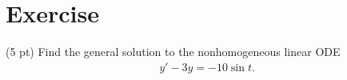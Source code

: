 %
%
\section{Exercise}

(5 pt) Find the general solution to the nonhomogeneous linear ODE
\begin{align*}
y' - 3 y
=
-10 \sin t.
\end{align*}

